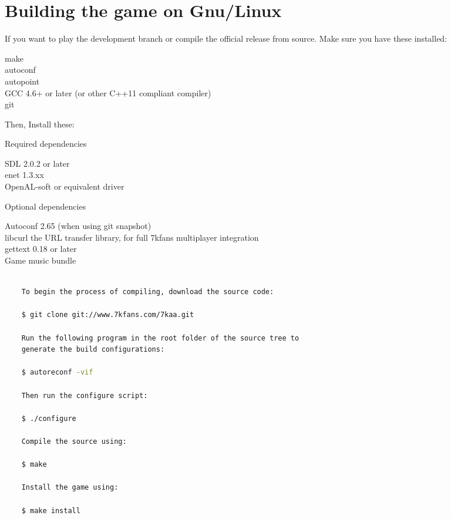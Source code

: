 \documentclass[10pt,a4paper]{article}
\begin{document}
	\section{Building the game on Gnu/Linux}
	
	If you want to play the development branch or compile the official release from source. Make sure you have these installed: 
	\begin{adjustwidth}{1cm}{}
		make \\
		autoconf \\
		autopoint \\
		GCC 4.6+ or later (or other C++11 compliant compiler) \\
		git
	\end{adjustwidth}
	
	Then, Install these:
	
	Required dependencies
	\begin{adjustwidth}{1cm}{}
		SDL 2.0.2 or later \\
		enet 1.3.xx \\
		OpenAL-soft or equivalent driver
	\end{adjustwidth}
	
	Optional dependencies
	\begin{adjustwidth}{1cm}{}
		Autoconf 2.65 (when using git snapshot) \\
		libcurl the URL transfer library, for full 7kfans multiplayer integration \\
		gettext 0.18 or later \\
		Game music bundle
	\end{adjustwidth}
	
	\begin{lstlisting}[language=bash]
	
	To begin the process of compiling, download the source code:
	
	$ git clone git://www.7kfans.com/7kaa.git
	
	Run the following program in the root folder of the source tree to 
	generate the build configurations: 
	
	$ autoreconf -vif
	
	Then run the configure script:
	
	$ ./configure
	
	Compile the source using:
	
	$ make
	
	Install the game using:
	
	$ make install
	
	\end{lstlisting}
	
\end{document}

